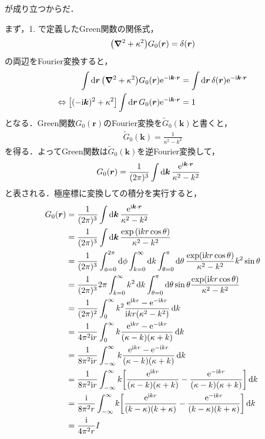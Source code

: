 \documentclass{report}
\begin{document}
    が成り立つからだ．
    \par
    まず，1. で定義したGreen関数の関係式，
    \begin{align}
      \qty(\grad^2 + \kappa^2)G_0(\bm{r}) = \delta(\bm{r})
    \end{align}
    の両辺をFourier変換すると，
    \begin{align}
      \int\dd{\bm{r}} \qty(\grad^2 + \kappa^2) G_0(\bm{r}) \mathrm{e}^{-\mathrm{i}\bm{k} \cdot \bm{r}} &= \int\dd{\bm{r}} \delta(\bm{r})\mathrm{e}^{-\mathrm{i}\bm{k}\cdot\bm{r}} \\
      \Leftrightarrow \qty[(-\mathrm{i}\bm{k})^2 + \kappa^2] \int\dd{\bm{r}} G_0(\bm{r}) \mathrm{e}^{-\mathrm{i} \bm{k}\cdot \bm{r}} &= 1
    \end{align}
    となる．Green関数$G_0(\bm{r})$のFourier変換を$\tilde{G}_0(\bm{k})$と書くと，
    \begin{align}
      \tilde{G}_0(\bm{k}) = \frac{1}{\kappa^2 - k^2}
    \end{align}
    を得る．よってGreen関数は$\tilde{G}_0(\bm{k})$を逆Fourier変換して，
    \begin{align}
      G_0(\bm{r}) &= \frac{1}{(2\pi)^3}\int\dd{\bm{k}} \frac{\mathrm{e}^{\mathrm{i}\bm{k} \cdot \bm{r}}}{\kappa^2 - k^2}\label{g-tilde-to-gr}
    \end{align}
    と表される．極座標に変換しての積分を実行すると，
    \begin{align}
      G_0(\bm{r}) &=  \frac{1}{(2\pi)^3}\int\dd{\bm{k}}\frac{\mathrm{e}^{\mathrm{i}\bm{k} \cdot \bm{r}}}{\kappa^2 - k^2}\\ 
      &= \frac{1}{(2\pi)^3} \int\dd{\bm{k}} \frac{\exp\qty(\mathrm{i} kr\cos\theta)}{\kappa^2 - k^2} \\ 
      &= \frac{1}{(2\pi)^3} \int_{\phi = 0}^{2\pi}\dd{\phi}\int_{k = 0}^{\infty}\dd{k}\int_{\theta = 0}^{\pi}\dd{\theta} \frac{\exp(\mathrm{i} kr \cos \theta)}{\kappa^2 - k^2} k^2\sin\theta \\
      &= \frac{1}{(2\pi)^3} 2\pi \int_{k = 0}^{\infty} k^2 \dd{k} \int_{\theta = 0}^{\pi}\dd{\theta} \sin\theta\frac{\exp(\mathrm{i} k r\cos\theta)}{\kappa^2 - k^2} \\
      &= \frac{1}{(2\pi)^2} \int_{0}^{\infty}k^2\frac{\mathrm{e}^{\mathrm{i} kr} - \mathrm{e}^{-\mathrm{i} kr}}{\mathrm{i} kr\qty(\kappa^2 - k^2)}\dd{k} \\
      &= \frac{1}{4\pi^2\mathrm{i} r} \int_{0}^{\infty}k \frac{\mathrm{e}^{\mathrm{i} kr} - \mathrm{e}^{-\mathrm{i} kr}}{(\kappa - k)(\kappa + k)}\dd{k} \\
      &= \frac{1}{8\pi^2\mathrm{i} r} \int_{-\infty}^{\infty}k \frac{\mathrm{e}^{\mathrm{i} kr} - \mathrm{e}^{-\mathrm{i} kr}}{(\kappa - k)(\kappa + k)}\dd{k} \\
      &= \frac{1}{8\pi^2\mathrm{i} r} \int_{-\infty}^{\infty}k \qty[\frac{\mathrm{e}^{\mathrm{i} kr}}{(\kappa - k)(\kappa + k)} - \frac{\mathrm{e}^{-\mathrm{i} kr}}{(\kappa - k)(\kappa + k)}]\dd{k} \\ 
      &= \frac{\mathrm{i}}{8\pi^2 r} \int_{-\infty}^{\infty}k \qty[\frac{\mathrm{e}^{\mathrm{i} kr}}{(k - \kappa)(k + \kappa)} - \frac{\mathrm{e}^{-\mathrm{i} kr}}{(k - \kappa)(k + \kappa)}]\dd{k} \\ 
      &= \frac{\mathrm{i}}{4\pi^2 r}I
    \end{align}
\end{document}
